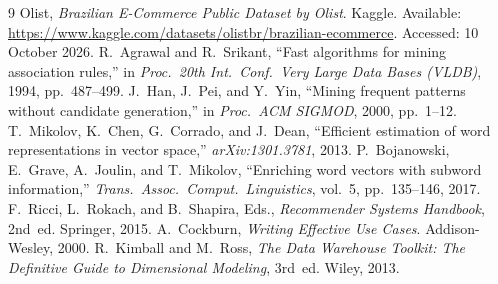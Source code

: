 \documentclass[a4paper,12pt]{article}
\begin{document}
\clearpage
{}
{}
\begin{thebibliography}{9}
   Olist, \emph{Brazilian E-Commerce Public Dataset by Olist}.
    Kaggle. Available: \url{https://www.kaggle.com/datasets/olistbr/brazilian-ecommerce}.
    Accessed: 10 October 2026.
   R.~Agrawal and R.~Srikant, ``Fast algorithms for mining association rules,''
    in \emph{Proc.\ 20th Int.\ Conf.\ Very Large Data Bases (VLDB)}, 1994, pp.~487--499.
   J.~Han, J.~Pei, and Y.~Yin, ``Mining frequent patterns without candidate
    generation,'' in \emph{Proc.\ ACM SIGMOD}, 2000, pp.~1--12.
   T.~Mikolov, K.~Chen, G.~Corrado, and J.~Dean, ``Efficient estimation of word
    representations in vector space,'' \emph{arXiv:1301.3781}, 2013.
   P.~Bojanowski, E.~Grave, A.~Joulin, and T.~Mikolov, ``Enriching word vectors
    with subword information,'' \emph{Trans.\ Assoc.\ Comput.\ Linguistics}, vol.~5, pp.~135--146, 2017.
   F.~Ricci, L.~Rokach, and B.~Shapira, Eds., \emph{Recommender Systems Handbook},
    2nd~ed. Springer, 2015.
   A.~Cockburn, \emph{Writing Effective Use Cases}. Addison-Wesley, 2000.
   R.~Kimball and M.~Ross, \emph{The Data Warehouse Toolkit: The Definitive Guide
    to Dimensional Modeling}, 3rd~ed. Wiley, 2013.
\end{thebibliography}
\end{document}
